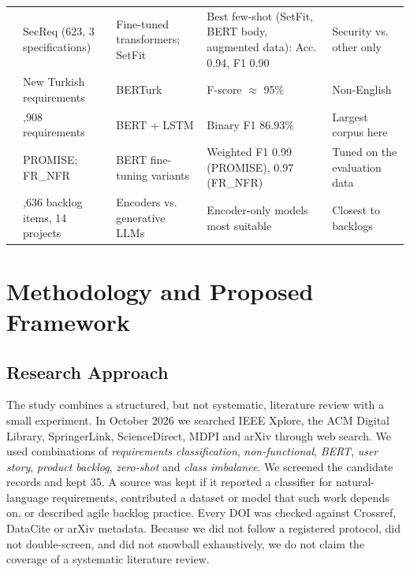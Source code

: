 \documentclass[conference,10pt,letterpaper]{IEEEtran}
\begin{document}
\begin{table}[!t]
\begin{tabular}{>{\raggedright\arraybackslash}p{2.3cm}>{\raggedright\arraybackslash}p{3.0cm}>{\raggedright\arraybackslash}p{3.1cm}>{\raggedright\arraybackslash}p{4.3cm}>{\raggedright\arraybackslash}p{3.6cm}}
\cite{petrillo2025} & SecReq (623, 3 specifications) & Fine-tuned transformers; SetFit & Best few-shot (SetFit, BERT body, augmented data): Acc. 0.94, F1 0.90 & Security vs. other only \\
\cite{yucalar2023} & New Turkish requirements & BERTurk & F-score $\approx$ 95\% & Non-English \\
\cite{alsanoosy2026} & 4,908 requirements & BERT + LSTM & Binary F1 86.93\% & Largest corpus here \\
\cite{eltahier2025} & PROMISE; FR\_NFR & BERT fine-tuning variants & Weighted F1 0.99 (PROMISE), 0.97 (FR\_NFR) & Tuned on the evaluation data \\
\cite{vancan2025} & 1,636 backlog items, 14 projects & Encoders vs. generative LLMs & Encoder-only models most suitable & Closest to backlogs \\
\bottomrule
\end{tabular}
\end{table}

\section{Methodology and Proposed Framework}\label{sec:method}
\subsection{Research Approach}
The study combines a structured, but not systematic, literature review with a small experiment. In October 2026 we searched IEEE Xplore, the ACM Digital Library, SpringerLink, ScienceDirect, MDPI and arXiv through web search. We used combinations of \emph{requirements classification}, \emph{non-functional}, \emph{BERT}, \emph{user story}, \emph{product backlog}, \emph{zero-shot} and \emph{class imbalance}. We screened the candidate records and kept 35. A source was kept if it reported a classifier for natural-language requirements, contributed a dataset or model that such work depends on, or described agile backlog practice. Every DOI was checked against Crossref, DataCite or arXiv metadata. Because we did not follow a registered protocol, did not double-screen, and did not snowball exhaustively, we do not claim the coverage of a systematic literature review.
\end{document}
